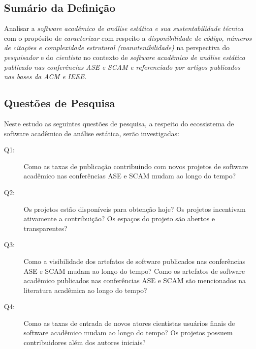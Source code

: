 \subsection{Sumário da Definição}



Analisar a \textit{software acadêmico de análise estática e sua sustentabilidade técnica} %
com o propósito de \textit{caracterizar}  %
com respeito a \textit{disponibilidade de código, números de citações e complexidade estrutural (manutenibilidade)}  %
na perspectiva do \textit{pesquisador} e do \textit{cientista}%
no contexto de \textit{software acadêmico de análise estática publicado nas conferências ASE e SCAM 
e referenciado por artigos publicados nas bases da ACM e IEEE}. %
%


\subsection{Questões de Pesquisa}

Neste estudo as seguintes questões de pesquisa, a respeito do ecossistema de
software acadêmico de análise estática, serão investigadas:

\newcommand{\EstudoDoisQuestaoUm}{Como as taxas de publicação contribuindo com novos projetos de software acadêmico nas conferências ASE e SCAM mudam ao longo do tempo?}
\newcommand{\EstudoDoisQuestaoDois}{Os projetos estão disponíveis para obtenção hoje? Os projetos incentivam ativamente a contribuição? Os espaços do projeto são abertos e transparentes?}
\newcommand{\EstudoDoisQuestaoTres}{Como a visibilidade dos artefatos de software publicados nas conferências ASE e SCAM mudam ao longo do tempo? Como os artefatos de software acadêmico publicados nas conferências ASE e SCAM são mencionados na literatura acadêmica ao longo do tempo?}
\newcommand{\EstudoDoisQuestaoQuatro}{Como as taxas de entrada de novos atores cientistas usuários finais de software acadêmico mudam ao longo do tempo? Os projetos possuem contribuidores além dos autores iniciais?}

\begin{description}
  \item [Q1:] \EstudoDoisQuestaoUm
  \item [Q2:] \EstudoDoisQuestaoDois
  \item [Q3:] \EstudoDoisQuestaoTres
  \item [Q4:] \EstudoDoisQuestaoQuatro
\end{description}


